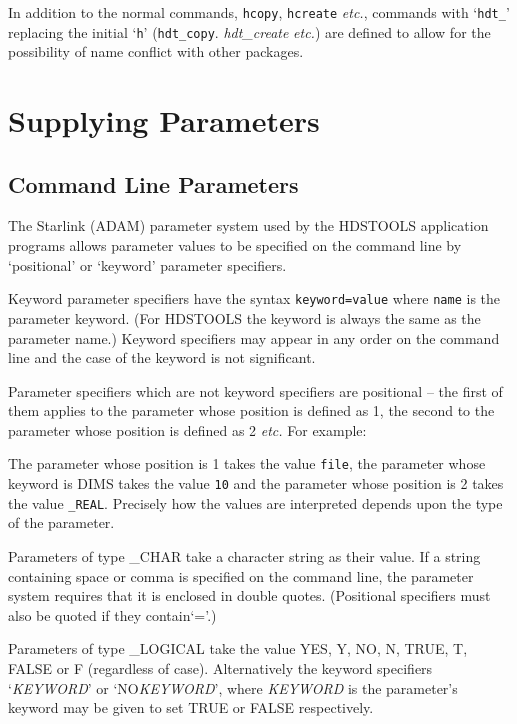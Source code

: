 \documentclass[twoside,11pt,nolof]{starlink}
\begin{document}
In addition to the normal commands, \texttt{hcopy}, \texttt{hcreate}
\textit{etc.}, commands with `\texttt{hdt\_}' replacing the initial
`\texttt{h}' (\texttt{hdt\_copy}. \textit{hdt\_create} \textit{etc.}) are
defined to allow for the possibility of name conflict with other packages.

\section{Supplying Parameters}

\subsection{Command Line Parameters}
The Starlink (ADAM) parameter system used by the HDSTOOLS application programs
allows parameter values to be specified on the command line by `positional' or
`keyword' parameter specifiers.

Keyword parameter specifiers have the syntax
\texttt{keyword=value} where \texttt{name} is the parameter keyword.
(For HDSTOOLS the keyword is always the same as the parameter name.)
Keyword specifiers may appear in any order on the command line and the case of
the keyword is not significant.

Parameter specifiers which are not keyword specifiers are positional -- the
first of them applies to the parameter whose position is defined as 1,
the second to the parameter whose position is defined as 2 \textit{etc.}
For example:
\begin{terminalv}
\end{terminalv}
The parameter whose position is 1 takes the value \texttt{file}, the parameter
whose keyword is DIMS takes the value \texttt{10} and the parameter whose
position is 2 takes the value \texttt{\_REAL}. Precisely how the values are
interpreted depends upon the type of the parameter.

Parameters of type \_CHAR take a character string as their value. If a string
containing space or comma is specified on the command line, the parameter
system requires that it is enclosed in double quotes. (Positional specifiers
must also be quoted if they contain`='.)

Parameters of type \_LOGICAL take the value YES, Y, NO, N, TRUE, T, FALSE or F
(regardless of case). Alternatively the keyword specifiers `\textit{KEYWORD}'
or `NO\textit{KEYWORD}', where \textit{KEYWORD} is the parameter's keyword
may be given to set TRUE or FALSE respectively.
\end{document}

